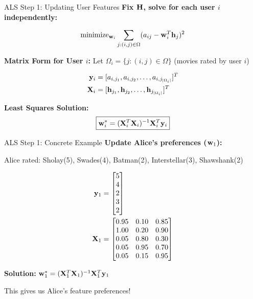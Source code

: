 \documentclass{beamer}
\begin{document}
\begin{frame}{ALS Step 1: Updating User Features}
\textbf{Fix $\mathbf{H}$, solve for each user $i$ independently:}

\pause
\begin{equation*}
\operatorname{minimize}_{\mathbf{w}_i} \sum_{j: (i,j) \in \Omega} (a_{ij} - \mathbf{w}_i^T \mathbf{h}_j)^2
\end{equation*}

\pause
\textbf{Matrix Form for User $i$:}
Let $\Omega_i = \{j: (i,j) \in \Omega\}$ (movies rated by user $i$)

\pause
\begin{align}
\mathbf{y}_i &= [a_{i,j_1}, a_{i,j_2}, \ldots, a_{i,j_{|\Omega_i|}}]^T \\
\mathbf{X}_i &= [\mathbf{h}_{j_1}, \mathbf{h}_{j_2}, \ldots, \mathbf{h}_{j_{|\Omega_i|}}]^T
\end{align}

\pause
\textbf{Least Squares Solution:}
\begin{equation*}
\boxed{\mathbf{w}_i^* = (\mathbf{X}_i^T \mathbf{X}_i)^{-1} \mathbf{X}_i^T \mathbf{y}_i}
\end{equation*}
\end{frame}

\begin{frame}{ALS Step 1: Concrete Example}
\textbf{Update Alice's preferences ($\mathbf{w}_1$):}

Alice rated: Sholay(5), Swades(4), Batman(2), Interstellar(3), Shawshank(2)

\pause
\begin{align}
\mathbf{y}_1 &= \begin{bmatrix} 5 \\ 4 \\ 2 \\ 3 \\ 2 \end{bmatrix} \\
\mathbf{X}_1 &= \begin{bmatrix} 
0.95 & 0.10 & 0.85 \\
1.00 & 0.20 & 0.90 \\
0.05 & 0.80 & 0.30 \\
0.05 & 0.95 & 0.70 \\
0.05 & 0.15 & 0.95
\end{bmatrix}
\end{align}

\pause
\textbf{Solution:} $\mathbf{w}_1^* = (\mathbf{X}_1^T \mathbf{X}_1)^{-1} \mathbf{X}_1^T \mathbf{y}_1$

This gives us Alice's feature preferences!
\end{frame}
\end{document}
